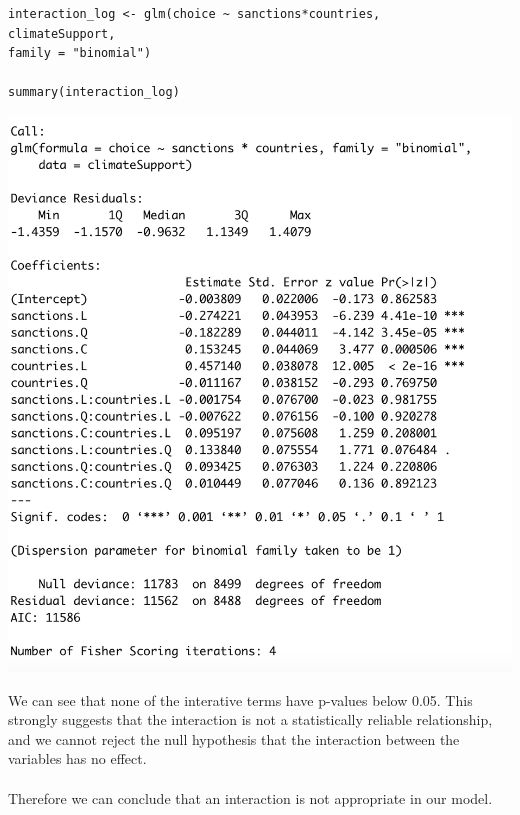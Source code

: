 \documentclass[12pt,letterpaper]{article}
\begin{document}
\begin{verbatim}
interaction_log <- glm(choice ~ sanctions*countries,
climateSupport,
family = "binomial")

summary(interaction_log)
\end{verbatim}

\includegraphics{reg_interactive_output.png}

\noindent
We can see that none of the interative terms have p-values below 0.05. This strongly suggests that the interaction is not a statistically reliable relationship, and we cannot reject the null hypothesis that the interaction between the variables has no effect.
\\\\
\noindent Therefore we can conclude that an interaction is not appropriate in our model. 
\end{document}
